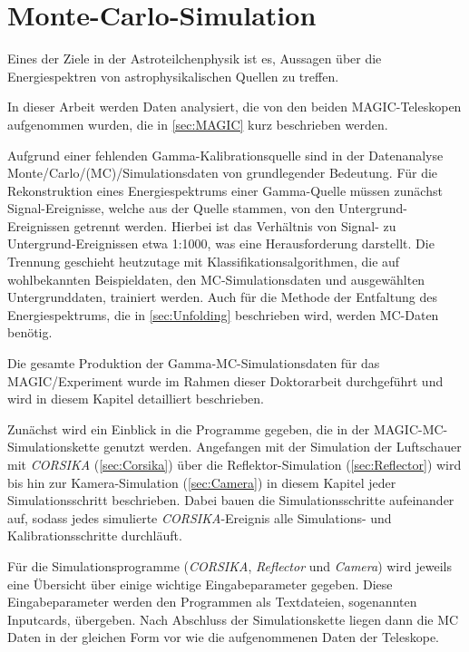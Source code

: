 \chapter{Monte-Carlo-Simulation}
\label{chapter:MC-Simulation}
Eines der Ziele in der Astroteilchenphysik ist es, Aussagen über die Energiespektren von astrophysikalischen Quellen zu treffen.

In dieser Arbeit werden Daten analysiert, die von den beiden MAGIC-Teleskopen\cite{MAGIC_Telescopes} aufgenommen wurden, die in \autoref{sec:MAGIC} kurz beschrieben werden.

Aufgrund einer fehlenden Gamma-Kalibrationsquelle sind in der Datenanalyse Monte\-/Carlo\-/(MC)\-/Simulationsdaten von grundlegender Bedeutung.
Für die Rekonstruktion eines Energiespektrums einer Gamma-Quelle müssen zunächst Signal-Ereignisse, welche aus der Quelle stammen, von den Untergrund-Ereignissen getrennt werden.
Hierbei ist das Verhältnis von Signal- zu Untergrund-Ereignissen etwa 1:1000\cite{Weekes}, was eine Herausforderung darstellt.
Die Trennung geschieht heutzutage mit Klassifikationsalgorithmen, die auf wohlbekannten Beispieldaten, den MC-Simulationsdaten und ausgewählten Untergrunddaten, trainiert werden.
Auch für die Methode der Entfaltung des Energiespektrums, die in \autoref{sec:Unfolding} beschrieben wird, werden MC-Daten benötig.

Die gesamte Produktion der Gamma-MC-Simulationsdaten für das MAGIC\-/Experiment wurde im Rahmen dieser Doktorarbeit durchgeführt und wird in diesem Kapitel detailliert beschrieben.

Zunächst wird ein Einblick in die Programme gegeben, die in der MAGIC-MC-Simulationskette genutzt werden.
Angefangen mit der Simulation der Luftschauer mit \textit{CORSIKA} \cite{CORSIKA} (\autoref{sec:Corsika}) über die Reflektor-Simulation \cite{Reflector} (\autoref{sec:Reflector}) wird bis hin zur Kamera-Simulation \cite{Camera} (\autoref{sec:Camera}) in diesem Kapitel jeder Simulationsschritt beschrieben.
Dabei bauen die Simulationsschritte aufeinander auf, sodass jedes simulierte \textit{CORSIKA}-Ereignis alle Simulations- und Kalibrationsschritte durchläuft.

Für die Simulationsprogramme (\textit{CORSIKA}, \textit{Reflector} und \textit{Camera}) wird jeweils eine Übersicht über einige wichtige Eingabeparameter gegeben.
Diese Eingabeparameter werden den Programmen als Textdateien, sogenannten Inputcards, übergeben.
Nach Abschluss der Simulationskette liegen dann die MC Daten in der gleichen Form vor wie die aufgenommenen Daten der Teleskope. 

